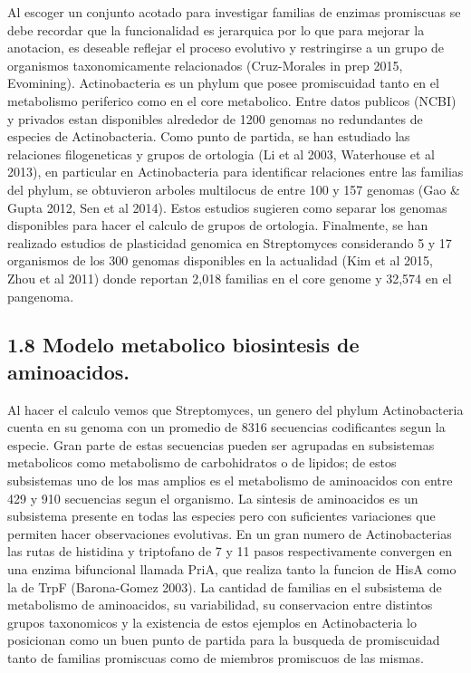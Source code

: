 \documentclass[12pt,twoside]{reedthesis}
\begin{document}
  Al escoger un conjunto acotado para investigar familias de enzimas
  promiscuas se debe recordar que la funcionalidad es jerarquica por lo
  que para mejorar la anotacion, es deseable reflejar el proceso evolutivo
  y restringirse a un grupo de organismos taxonomicamente relacionados
  (Cruz-Morales in prep 2015, Evomining). Actinobacteria es un phylum que
  posee promiscuidad tanto en el metabolismo periferico como en el core
  metabolico. Entre datos publicos (NCBI) y privados estan disponibles
  alrededor de 1200 genomas no redundantes de especies de Actinobacteria.
  Como punto de partida, se han estudiado las relaciones filogeneticas y
  grupos de ortologia (Li et al 2003, Waterhouse et al 2013), en
  particular en Actinobacteria para identificar relaciones entre las
  familias del phylum, se obtuvieron arboles multilocus de entre 100 y 157
  genomas (Gao \& Gupta 2012, Sen et al 2014). Estos estudios sugieren
  como separar los genomas disponibles para hacer el calculo de grupos de
  ortologia. Finalmente, se han realizado estudios de plasticidad genomica
  en Streptomyces considerando 5 y 17 organismos de los 300 genomas
  disponibles en la actualidad (Kim et al 2015, Zhou et al 2011) donde
  reportan 2,018 familias en el core genome y 32,574 en el pangenoma.
  
  \subsection{1.8 Modelo metabolico biosintesis de
  aminoacidos.}\label{modelo-metabolico-biosintesis-de-aminoacidos.}
  
  Al hacer el calculo vemos que Streptomyces, un genero del phylum
  Actinobacteria cuenta en su genoma con un promedio de 8316 secuencias
  codificantes segun la especie. Gran parte de estas secuencias pueden ser
  agrupadas en subsistemas metabolicos como metabolismo de carbohidratos o
  de lipidos; de estos subsistemas uno de los mas amplios es el
  metabolismo de aminoacidos con entre 429 y 910 secuencias segun el
  organismo. La sintesis de aminoacidos es un subsistema presente en todas
  las especies pero con suficientes variaciones que permiten hacer
  observaciones evolutivas. En un gran numero de Actinobacterias las rutas
  de histidina y triptofano de 7 y 11 pasos respectivamente convergen en
  una enzima bifuncional llamada PriA, que realiza tanto la funcion de
  HisA como la de TrpF (Barona-Gomez 2003). La cantidad de familias en el
  subsistema de metabolismo de aminoacidos, su variabilidad, su
  conservacion entre distintos grupos taxonomicos y la existencia de estos
  ejemplos en Actinobacteria lo posicionan como un buen punto de partida
  para la busqueda de promiscuidad tanto de familias promiscuas como de
  miembros promiscuos de las mismas.
  
\end{document}
